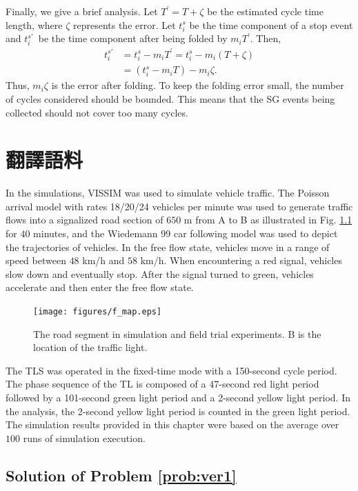 \documentclass[final,oneside,onecolumn,12pt,a4paper]{book}%
\begin{document}
Finally, we give a brief analysis. Let $T^{\prime}=T+\zeta$ be the estimated
cycle time length, where $\zeta$ represents the error. Let $t_{i}^{s}$ be the
time component of a stop event and $t_{i}^{s\prime}$\ be the time component
after being folded by $m_{i}T^{\prime}$. Then,
\begin{align*}
t_{i}^{s\prime}  &  =t_{i}^{s}-m_{i}T^{\prime}=t_{i}^{s}-m_{i}\left(
T+\zeta\right) \\
&  =\left(  t_{i}^{s}-m_{i}T\right)  -m_{i}\zeta.
\end{align*}
Thus, $m_{i}\zeta$ is the error after folding. To keep the folding error
small, the number of cycles considered should be bounded. This means that the
SG events being collected should not cover too many cycles.

\chapter{翻譯語料}

\label{cha:simulation-results}

In the simulations, VISSIM \cite{Mosseri2004VISSIM} was used to simulate
vehicle traffic. The Poisson arrival model with rates 18/20/24 vehicles per
minute was used to generate traffic flows into a signalized road section of
$650$ m from A to B as illustrated in Fig. \ref{fig:f_map} for $40$ minutes,
and the Wiedemann 99 car following model \cite{Mosseri2004VISSIM} was used to
depict the trajectories of vehicles. In the free flow state, vehicles move in
a range of speed between $48$ km/h and $58$ km/h. When encountering a red
signal, vehicles slow down and eventually stop. After the signal turned to
green, vehicles accelerate and then enter the free flow state.
\begin{figure}[pth]
\centerline{\texttt{[image: figures/f\_map.eps]}} \hfill\caption{The road segment in simulation and field
trial experiments. B is the location of the traffic light.}%
\label{fig:f_map}%
\end{figure}

The TLS was operated in the fixed-time mode with a 150-second cycle period.
The phase sequence of the TL is composed of a 47-second red light period
followed by a 101-second green light period and a 2-second yellow light
period. In the analysis, the 2-second yellow light period is counted in the
green light period. The simulation results provided in this chapter were based
on the average over $100$ runs of simulation execution.

\section{Solution of Problem \ref{prob:ver1}}
\end{document}
